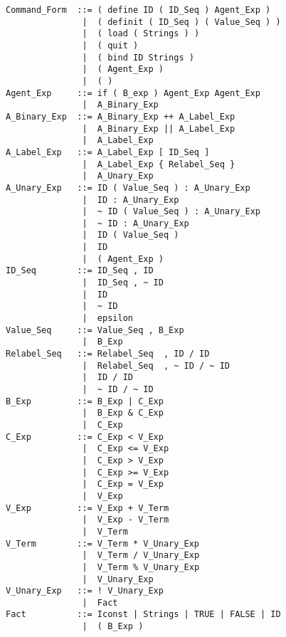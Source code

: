 \footnotesize
  \begin{verbatim}
Command_Form  ::= ( define ID ( ID_Seq ) Agent_Exp )
               |  ( definit ( ID_Seq ) ( Value_Seq ) )
               |  ( load ( Strings ) )
               |  ( quit )
               |  ( bind ID Strings )
               |  ( Agent_Exp )
               |  ( )
Agent_Exp     ::= if ( B_exp ) Agent_Exp Agent_Exp
               |  A_Binary_Exp
A_Binary_Exp  ::= A_Binary_Exp ++ A_Label_Exp
               |  A_Binary_Exp || A_Label_Exp
               |  A_Label_Exp
A_Label_Exp   ::= A_Label_Exp [ ID_Seq ]
               |  A_Label_Exp { Relabel_Seq }
               |  A_Unary_Exp
A_Unary_Exp   ::= ID ( Value_Seq ) : A_Unary_Exp
               |  ID : A_Unary_Exp
               |  ~ ID ( Value_Seq ) : A_Unary_Exp
               |  ~ ID : A_Unary_Exp
               |  ID ( Value_Seq )
               |  ID
               |  ( Agent_Exp )
ID_Seq        ::= ID_Seq , ID
               |  ID_Seq , ~ ID
               |  ID
               |  ~ ID
               |  epsilon
Value_Seq     ::= Value_Seq , B_Exp
               |  B_Exp
Relabel_Seq   ::= Relabel_Seq  , ID / ID
               |  Relabel_Seq  , ~ ID / ~ ID
               |  ID / ID
               |  ~ ID / ~ ID
B_Exp         ::= B_Exp | C_Exp
               |  B_Exp & C_Exp
               |  C_Exp
C_Exp         ::= C_Exp < V_Exp
               |  C_Exp <= V_Exp
               |  C_Exp > V_Exp
               |  C_Exp >= V_Exp
               |  C_Exp = V_Exp
               |  V_Exp
V_Exp         ::= V_Exp + V_Term
               |  V_Exp - V_Term
               |  V_Term
V_Term        ::= V_Term * V_Unary_Exp
               |  V_Term / V_Unary_Exp
               |  V_Term % V_Unary_Exp
               |  V_Unary_Exp
V_Unary_Exp   ::= ! V_Unary_Exp
               |  Fact
Fact          ::= Iconst | Strings | TRUE | FALSE | ID
               |  ( B_Exp )
  \end{verbatim}
